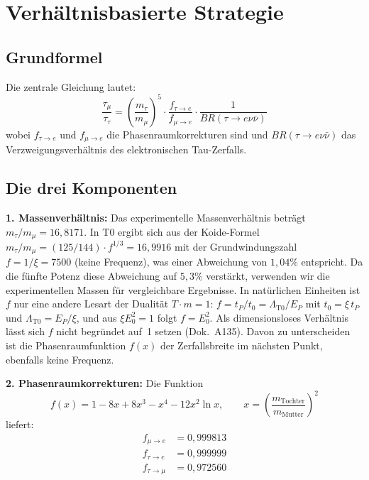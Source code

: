 	
	\section{Verhältnisbasierte Strategie}
	
	\subsection{Grundformel}
	
	Die zentrale Gleichung lautet:
	\begin{equation}
		\frac{\tau_\mu}{\tau_\tau} = \left(\frac{m_\tau}{m_\mu}\right)^5 \cdot \frac{f_{\tau \to e}}{f_{\mu \to e}} \cdot \frac{1}{BR(\tau \to e \nu \bar\nu)}
		\label{eq:lifetime-ratio}
	\end{equation}
	wobei $f_{\tau \to e}$ und $f_{\mu \to e}$ die Phasenraumkorrekturen sind und $BR(\tau \to e \nu \bar\nu)$ das Verzweigungsverhältnis des elektronischen Tau-Zerfalls.
	
	\subsection{Die drei Komponenten}
	
	\textbf{1. Massenverhältnis:} Das experimentelle Massenverhältnis beträgt $m_\tau/m_\mu = 16{,}8171$. In T0 ergibt sich aus der Koide-Formel $m_\tau/m_\mu = (125/144) \cdot f^{1/3} = 16{,}9916$ mit der Grundwindungszahl $f = 1/\xi = 7500$ (keine Frequenz), was einer Abweichung von $1{,}04\%$ entspricht. Da die fünfte Potenz diese Abweichung auf $5{,}3\%$ verstärkt, verwenden wir die experimentellen Massen für vergleichbare Ergebnisse.
	In natürlichen Einheiten ist $f$ nur eine andere Lesart der Dualität $T\cdot m = 1$: $f = t_P/t_0 = \Lambda_{\text{T0}}/E_P$ mit $t_0 = \xi\,t_P$ und $\Lambda_{\text{T0}} = E_P/\xi$, und aus $\xi E_0^2 = 1$ folgt $f = E_0^2$. Als dimensionsloses Verhältnis lässt sich $f$ nicht begründet auf~1 setzen (Dok.~A135). Davon zu unterscheiden ist die Phasenraumfunktion $f(x)$ der Zerfallsbreite im nächsten Punkt, ebenfalls keine Frequenz.

	\textbf{2. Phasenraumkorrekturen:} Die Funktion
	\begin{equation}
		f(x) = 1 - 8x + 8x^3 - x^4 - 12 x^2 \ln x, \qquad x = \left(\frac{m_\text{Tochter}}{m_\text{Mutter}}\right)^2
	\end{equation}
	liefert:
	\begin{align}
		f_{\mu \to e} &= 0{,}999813 \\
		f_{\tau \to e} &= 0{,}999999 \\
		f_{\tau \to \mu} &= 0{,}972560
	\end{align}
	
